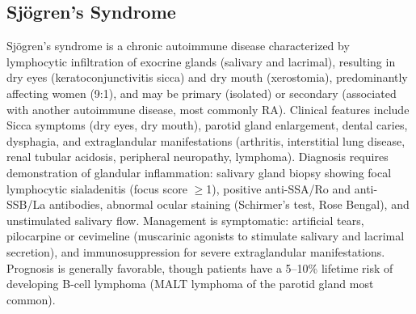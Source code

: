 \subsection{Sjögren's Syndrome}
\label{sec:Sjögren's Syndrome}
Sjögren's syndrome is a chronic autoimmune disease characterized by lymphocytic infiltration of exocrine glands (salivary and lacrimal), resulting in dry eyes (keratoconjunctivitis sicca) and dry mouth (xerostomia), predominantly affecting women (9:1), and may be primary (isolated) or secondary (associated with another autoimmune disease, most commonly RA). Clinical features include Sicca symptoms (dry eyes, dry mouth), parotid gland enlargement, dental caries, dysphagia, and extraglandular manifestations (arthritis, interstitial lung disease, renal tubular acidosis, peripheral neuropathy, lymphoma). Diagnosis requires demonstration of glandular inflammation: salivary gland biopsy showing focal lymphocytic sialadenitis (focus score $\geq$1), positive anti-SSA/Ro and anti-SSB/La antibodies, abnormal ocular staining (Schirmer's test, Rose Bengal), and unstimulated salivary flow. Management is symptomatic: artificial tears, pilocarpine or cevimeline (muscarinic agonists to stimulate salivary and lacrimal secretion), and immunosuppression for severe extraglandular manifestations. Prognosis is generally favorable, though patients have a 5--10\% lifetime risk of developing B-cell lymphoma (MALT lymphoma of the parotid gland most common).

